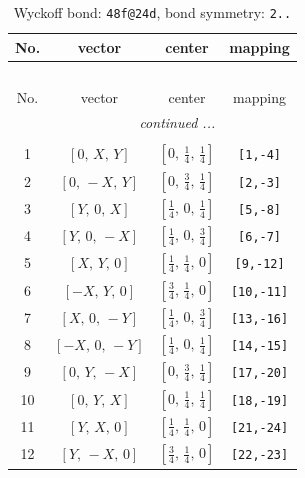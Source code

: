 \documentclass[fleqn,8pt]{jsarticle}
\begin{document}
\renewcommand{\arraystretch}{1.2}
\begin{longtable}{cccc}
\caption{Wyckoff bond: {\tt 48f@24d}, bond symmetry: {\tt 2..}}
 \\
 \hline \hline
No. & vector & center & mapping \\ \hline \endfirsthead

\multicolumn{3}{l}{\tablename\ \thetable{}} \\
 \hline \hline
No. & vector & center & mapping \\ \hline \endhead

 \hline \hline
\multicolumn{3}{r}{\footnotesize\it continued ...} \\ \endfoot

 \hline \hline
\multicolumn{3}{r}{} \\ \endlastfoot

1 & $\left[ 0,\, X,\, Y \right]$ & $\left[ 0,\, \frac{1}{4},\, \frac{1}{4} \right]$ & {\tt [1,-4]} \\ \hline
2 & $\left[ 0,\, - X,\, Y \right]$ & $\left[ 0,\, \frac{3}{4},\, \frac{1}{4} \right]$ & {\tt [2,-3]} \\ \hline
3 & $\left[ Y,\, 0,\, X \right]$ & $\left[ \frac{1}{4},\, 0,\, \frac{1}{4} \right]$ & {\tt [5,-8]} \\ \hline
4 & $\left[ Y,\, 0,\, - X \right]$ & $\left[ \frac{1}{4},\, 0,\, \frac{3}{4} \right]$ & {\tt [6,-7]} \\ \hline
5 & $\left[ X,\, Y,\, 0 \right]$ & $\left[ \frac{1}{4},\, \frac{1}{4},\, 0 \right]$ & {\tt [9,-12]} \\ \hline
6 & $\left[ - X,\, Y,\, 0 \right]$ & $\left[ \frac{3}{4},\, \frac{1}{4},\, 0 \right]$ & {\tt [10,-11]} \\ \hline
7 & $\left[ X,\, 0,\, - Y \right]$ & $\left[ \frac{1}{4},\, 0,\, \frac{3}{4} \right]$ & {\tt [13,-16]} \\ \hline
8 & $\left[ - X,\, 0,\, - Y \right]$ & $\left[ \frac{1}{4},\, 0,\, \frac{1}{4} \right]$ & {\tt [14,-15]} \\ \hline
9 & $\left[ 0,\, Y,\, - X \right]$ & $\left[ 0,\, \frac{3}{4},\, \frac{1}{4} \right]$ & {\tt [17,-20]} \\ \hline
10 & $\left[ 0,\, Y,\, X \right]$ & $\left[ 0,\, \frac{1}{4},\, \frac{1}{4} \right]$ & {\tt [18,-19]} \\ \hline
11 & $\left[ Y,\, X,\, 0 \right]$ & $\left[ \frac{1}{4},\, \frac{1}{4},\, 0 \right]$ & {\tt [21,-24]} \\ \hline
12 & $\left[ Y,\, - X,\, 0 \right]$ & $\left[ \frac{3}{4},\, \frac{1}{4},\, 0 \right]$ & {\tt [22,-23]} \\
\end{longtable}
\end{document}
